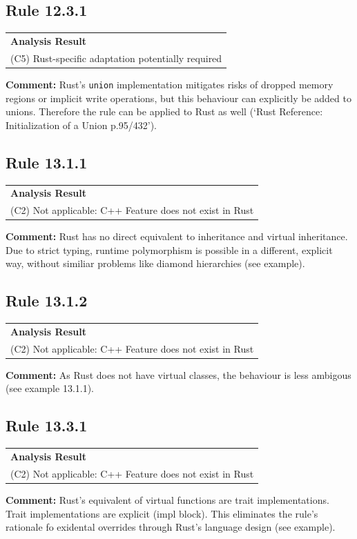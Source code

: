 \subsection*{Rule 12.3.1}
\begin{longtable}{p{13cm}}
\textbf{Analysis Result} \\
(C5) Rust-specific adaptation potentially required \\
\end{longtable}
\textbf{Comment:} Rust's \texttt{union} implementation mitigates risks of dropped memory regions or implicit write operations, but this behaviour can explicitly be added to unions. Therefore the rule can be applied to Rust as well (`Rust Reference: Initialization of a Union p.95/432'). \\
\subsection*{Rule 13.1.1}
\begin{longtable}{p{13cm}}
\textbf{Analysis Result} \\
(C2) Not applicable: C++ Feature does not exist in Rust \\
\end{longtable}
\textbf{Comment:} Rust has no direct equivalent to inheritance and virtual inheritance. Due to strict typing, runtime polymorphism is possible in a different, explicit way, without similiar problems like diamond hierarchies (see example). \\


\subsection*{Rule 13.1.2}
\begin{longtable}{p{13cm}}
\textbf{Analysis Result} \\
(C2) Not applicable: C++ Feature does not exist in Rust \\
\end{longtable}
\textbf{Comment:} As Rust does not have virtual classes, the behaviour is less ambigous (see example 13.1.1). \\
\subsection*{Rule 13.3.1}
\begin{longtable}{p{13cm}}
\textbf{Analysis Result} \\
(C2) Not applicable: C++ Feature does not exist in Rust \\
\end{longtable}
\textbf{Comment:} Rust's equivalent of virtual functions are trait implementations. Trait implementations are explicit (impl block). This eliminates the rule's rationale fo exidental overrides through Rust's language design (see example). \\


